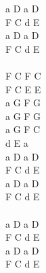 \documentclass[a5paper, 10pt]{book}
\begin{document}
\begin{minipage}[t]{0.4\textwidth}
  a D a D\\
  F C d E\\
  a D a D\\
  F C d E\\
  \\
  F C F C\\
  F C E E\\
  a G F G\\
  a G F G\\
  a G F C\\
  d E a\\

  a D a D\\
  F C d E\\
  a D a D\\
  F C d E\\

  ~\\

  a D a D\\
  F C d E\\
  a D a D\\
  F C d E\\

\end{minipage}

\newpage
\end{document}
